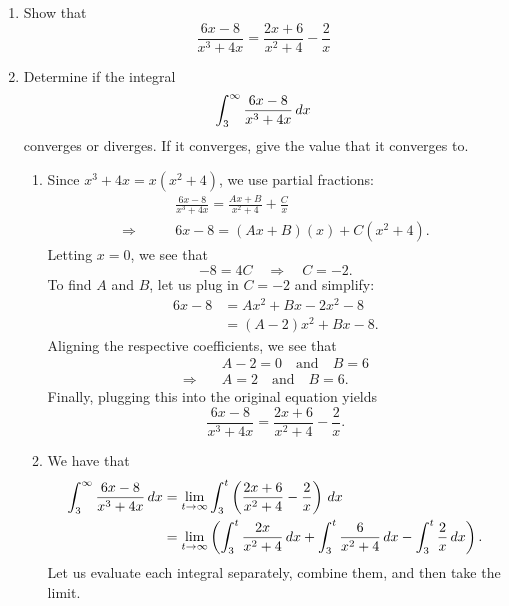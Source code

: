 \documentclass[noinstructornotes]{ximera}
\begin{document}
\begin{problem}
		\begin{enumerate}
	\item  Show that 
		\begin{equation*}
		\frac{6x-8}{x^3+4x} = \frac{2x+6}{x^2+4} - \frac{2}{x}
		\end{equation*}
	
	\item  Determine if the integral
		\begin{equation*}
		\int_3^\infty \frac{6x-8}{x^3+4x} \,d x
		\end{equation*}
	converges or diverges.  If it converges, give the value that it converges to.
	
	
	
	\begin{freeResponse}
	\begin{enumerate}
	\item
	Since $x^3+4x = x(x^2+4)$, we use partial fractions:
		\begin{align*}
		&\frac{6x-8}{x^3+4x} = \frac{Ax+B}{x^2+4} + \frac{C}{x}  \\
		\Longrightarrow 	\qquad	&6x-8 = (Ax+B)(x) + C(x^2+4).
		\end{align*}
	Letting $x=0$, we see that
		\begin{equation*}
		-8 = 4C \quad \Longrightarrow \quad C = -2.
		\end{equation*}
	To find $A$ and $B$, let us plug in $C=-2$ and simplify:
		\begin{align*}
		6x-8 &= Ax^2 + Bx -2x^2 - 8  \\
		&= (A-2)x^2 + Bx - 8.
		\end{align*}
	Aligning the respective coefficients, we see that
		\begin{align*}
		&A-2 = 0	\quad	\text{and}	\quad	B=6  \\
		\Longrightarrow		\quad	&A=2	\quad	\text{and}	\quad	B=6.
		\end{align*}
	Finally, plugging this into the original equation yields
		\begin{equation*}
		\frac{6x-8}{x^3+4x} = \frac{2x+6}{x^2+4} - \frac{2}{x}.
		\end{equation*}
		
		
		
		
	\item We have that
		\begin{align*}
		\int_3^\infty \frac{6x-8}{x^3+4x} \,d x &= \lim_{t \to \infty} \int_3^t \left( \frac{2x+6}{x^2+4} - \frac{2}{x} \right) \,d x  \\
		&= \lim_{t \to \infty} \left( \int_3^t \frac{2x}{x^2+4} \,d x + \int_3^t \frac{6}{x^2+4} \,d x - \int_3^t \frac{2}{x} \,d x \right).
		\end{align*}
	Let us evaluate each integral separately, combine them, and then take the limit.
	

\end{enumerate}
\end{freeResponse}
\end{enumerate}
\end{problem}
\end{document}
